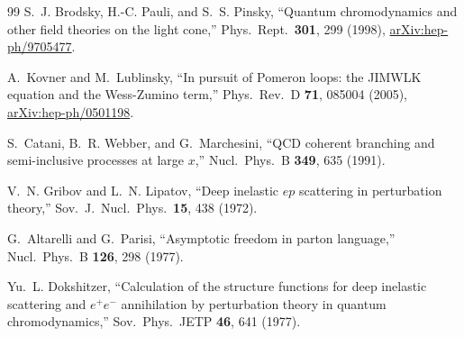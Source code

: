 \documentclass[aps,prd,onecolumn,superscriptaddress,nofootinbib,floatfix,longbibliography,11pt]{revtex4-2}
\numberwithin{equation}{section}
\begin{document}
\begin{thebibliography}{99}
S.~J. Brodsky, H.-C. Pauli, and S.~S. Pinsky, ``Quantum chromodynamics and other field theories on the light cone,'' Phys.\ Rept.\ \textbf{301}, 299 (1998), \href{https://arxiv.org/abs/hep-ph/9705477}{arXiv:hep-ph/9705477}.

A.~Kovner and M.~Lublinsky, ``In pursuit of Pomeron loops: the JIMWLK equation and the Wess-Zumino term,'' Phys.\ Rev.\ D \textbf{71}, 085004 (2005), \href{https://arxiv.org/abs/hep-ph/0501198}{arXiv:hep-ph/0501198}.

S.~Catani, B.~R. Webber, and G.~Marchesini, ``QCD coherent branching and semi-inclusive processes at large $x$,'' Nucl.\ Phys.\ B \textbf{349}, 635 (1991).

V.~N. Gribov and L.~N. Lipatov, ``Deep inelastic $e p$ scattering in perturbation theory,'' Sov.\ J.\ Nucl.\ Phys.\ \textbf{15}, 438 (1972).

G.~Altarelli and G.~Parisi, ``Asymptotic freedom in parton language,'' Nucl.\ Phys.\ B \textbf{126}, 298 (1977).

Yu.~L. Dokshitzer, ``Calculation of the structure functions for deep inelastic scattering and $e^+e^-$ annihilation by perturbation theory in quantum chromodynamics,'' Sov.\ Phys.\ JETP \textbf{46}, 641 (1977).

\end{thebibliography}
\end{document}

